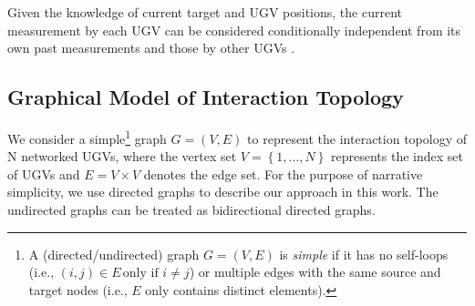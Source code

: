 	
	\begin{rem}
		Given the knowledge of current target and UGV positions, the current measurement by each UGV can be considered conditionally independent from its own past measurements and those by other UGVs \cite{bourgault2003optimal}.
	\end{rem}
	
	
	\subsection{Graphical Model of Interaction Topology}
	We consider a simple\footnote{A (directed/undirected) graph $G=(V,E)$ is \textit{simple} if it has no self-loops (i.e., $\left( i,j\right)\in E\,\text{only if } i\neq j$) or multiple edges with the same source and target nodes (i.e., $E$ only contains distinct elements).} graph $G=(V,E)$ to represent the interaction topology of N networked UGVs, where the vertex set $V=\left\lbrace 1,\dots,N\right\rbrace $ represents the index set of UGVs and $E=V\times V$ denotes the edge set. 
	For the purpose of narrative simplicity, we use directed graphs to describe our approach in this work.
	The undirected graphs can be treated as bidirectional directed graphs.
	
